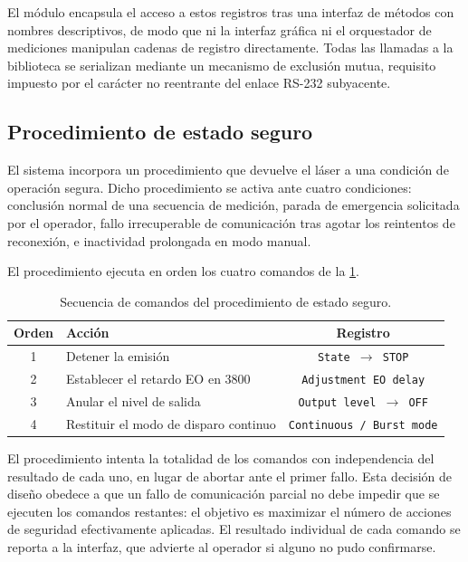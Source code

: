 El módulo encapsula el acceso a estos registros tras una interfaz de
métodos con nombres descriptivos, de modo que ni la interfaz gráfica
ni el orquestador de mediciones manipulan cadenas de registro
directamente. Todas las llamadas a la biblioteca se serializan
mediante un mecanismo de exclusión mutua, requisito impuesto por el
carácter no reentrante del enlace RS-232 subyacente.

\subsection*{Procedimiento de estado seguro}

El sistema incorpora un procedimiento que devuelve el láser a una
condición de operación segura. Dicho procedimiento se activa ante
cuatro condiciones: conclusión normal de una secuencia de medición,
parada de emergencia solicitada por el operador, fallo irrecuperable
de comunicación tras agotar los reintentos de reconexión, e
inactividad prolongada en modo manual.

El procedimiento ejecuta en orden los cuatro comandos de la
\cref{tab:modo_seguro}.

\begin{table}[H]
  \centering
  \caption{Secuencia de comandos del procedimiento de estado seguro.}
  \label{tab:modo_seguro}
  \begin{tabular}{clc}
    \toprule
    \textbf{Orden} & \textbf{Acción} & \textbf{Registro} \\
    \midrule
    1 & Detener la emisión                 & \texttt{State $\rightarrow$ STOP} \\
    2 & Establecer el retardo EO en 3800   & \texttt{Adjustment EO delay} \\
    3 & Anular el nivel de salida          & \texttt{Output level $\rightarrow$ OFF} \\
    4 & Restituir el modo de disparo continuo
                                           & \texttt{Continuous / Burst mode} \\
    \bottomrule
  \end{tabular}
\end{table}

El procedimiento intenta la totalidad de los comandos con
independencia del resultado de cada uno, en lugar de abortar ante el
primer fallo. Esta decisión de diseño obedece a que un fallo de
comunicación parcial no debe impedir que se ejecuten los comandos
restantes: el objetivo es maximizar el número de acciones de
seguridad efectivamente aplicadas. El resultado individual de cada
comando se reporta a la interfaz, que advierte al operador si alguno
no pudo confirmarse.

